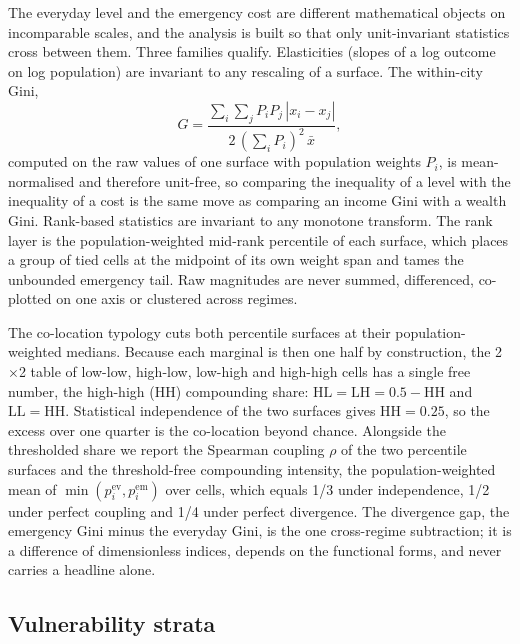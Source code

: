 \documentclass[11pt]{article}
\begin{document}
The everyday level and the emergency cost are different mathematical
objects on incomparable scales, and the analysis is built so that only
unit-invariant statistics cross between them. Three families qualify.
Elasticities (slopes of a log outcome on log population) are invariant to
any rescaling of a surface. The within-city Gini,
\begin{equation}
G = \frac{\sum_i \sum_j P_i P_j\, |x_i - x_j|}{2\,(\sum_i P_i)^2\, \bar{x}},
\label{eq:gini}
\end{equation}
computed on the raw values of one surface with population weights $P_i$,
is mean-normalised and therefore unit-free, so comparing the inequality of
a level with the inequality of a cost is the same move as comparing an
income Gini with a wealth Gini. Rank-based statistics are invariant to any
monotone transform. The rank layer is the population-weighted mid-rank
percentile of each surface, which places a group of tied cells at the
midpoint of its own weight span and tames the unbounded emergency tail.
Raw magnitudes are never summed, differenced, co-plotted on one axis or
clustered across regimes.

The co-location typology cuts both percentile surfaces at their
population-weighted medians. Because each marginal is then one half by
construction, the 2$\times$2 table of low-low, high-low, low-high and
high-high cells has a single free number, the high-high (HH) compounding
share: $\mathrm{HL} = \mathrm{LH} = 0.5 - \mathrm{HH}$ and
$\mathrm{LL} = \mathrm{HH}$. Statistical independence of the two surfaces
gives $\mathrm{HH} = 0.25$, so the excess over one quarter is the
co-location beyond chance. Alongside the thresholded share we report the
Spearman coupling $\rho$ of the two percentile surfaces and the
threshold-free compounding intensity, the population-weighted mean of
$\min(p^{\mathrm{ev}}_i, p^{\mathrm{em}}_i)$ over cells, which equals 1/3
under independence, 1/2 under perfect coupling and 1/4 under perfect
divergence. The divergence gap, the emergency Gini minus the everyday
Gini, is the one cross-regime subtraction; it is a difference of
dimensionless indices, depends on the functional forms, and never carries a
headline alone.

\subsection{Vulnerability strata}\label{sec:m-vulnerability}
\end{document}

